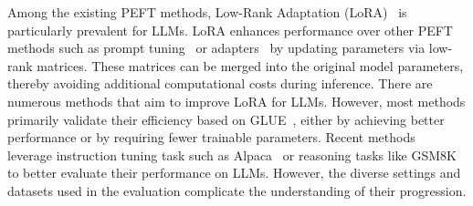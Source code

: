 \documentclass[11pt]{article}
\begin{document}
Among the existing PEFT methods, Low-Rank Adaptation (LoRA)~\cite{hu2021lora} is particularly prevalent for LLMs. LoRA enhances performance over other PEFT methods such as prompt tuning~\cite{lester2021power} or adapters~\cite{houlsby2019parameter} by updating parameters via low-rank matrices. These matrices can be merged into the original model parameters, thereby avoiding additional computational costs during inference. %
There are numerous methods that aim to improve LoRA for LLMs. However,
most methods primarily validate their efficiency based on GLUE~\cite{wang2018glue}, either by achieving better performance or by requiring fewer trainable parameters.
Recent methods~\cite{liu2024dora, meng2024periodiclora, zhu2024asymmetry} leverage instruction tuning task such as Alpaca~\cite{wang2024far} or reasoning tasks like GSM8K~\cite{cobbe2021training} to better evaluate their performance on LLMs.
However, the diverse settings and datasets used in the evaluation complicate the understanding of their progression.


\end{document}

